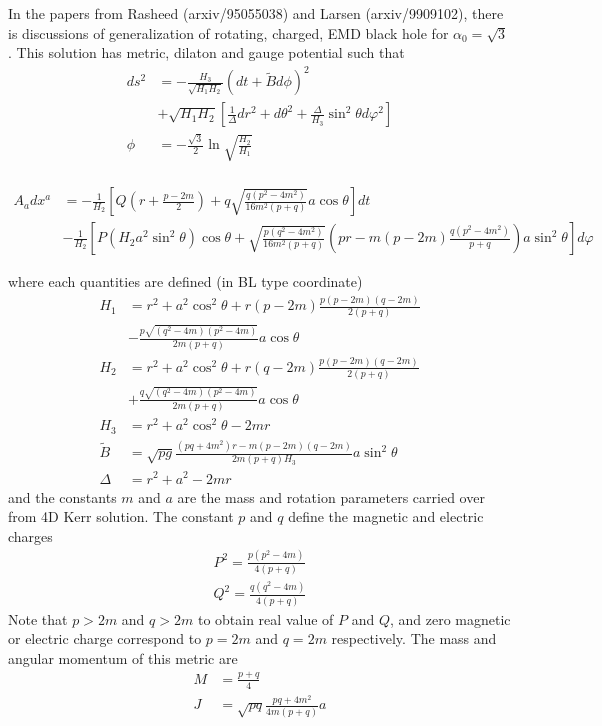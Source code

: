 \documentclass[%
 reprint,
 amsmath,amssymb,
 aps,
]{revtex4-1}
\begin{document}
In the papers from Rasheed (arxiv/95055038) and Larsen (arxiv/9909102), there is discussions of generalization of rotating, charged, EMD black hole for $\alpha_0 = \sqrt{3}$. This solution has metric, dilaton and gauge potential such that 
\begin{align}
ds^2 &= -\frac{H_3}{\sqrt{H_1 H_2}} (dt + \tilde{B} d \phi)^2 \nonumber \\
&+ \sqrt{H_1 H_2} \left[ \frac{1}{\Delta} dr^2 + d \theta^2 + \frac{\Delta}{H_3} \sin^2 \theta d \varphi^2 \right] \\
\phi &= -\frac{\sqrt{3}}{2} \ln \sqrt{\frac{H_2}{H_1}} \\
\end{align}
\begin{widetext}
\begin{align}
A_a dx^a &= - \frac{1}{H_2} \left[Q \left(r + \frac{p-2m}{2} \right) + q \sqrt{\frac{q (p^2-4m^2)}{16m^2 (p+q)}} a \cos \theta\right] dt \nonumber \\
	       &- \frac{1}{H_2} \left[ P (H_2 a^2 \sin^2 \theta) \cos \theta + \sqrt{\frac{p (q^2-4m^2)}{16m^2 (p+q)}} \left(pr-m(p-2m) \frac{q (p^2-4m^2)}{p+q} \right) a \sin^2 \theta \right] d\varphi
\end{align}
\end{widetext}
where each quantities are defined (in BL type coordinate)
\begin{align}
H_1 &= r^2 + a^2 \cos^2 \theta + r (p-2m) \frac{p(p-2m)(q-2m)}{2(p+q)}\nonumber \\
&-\frac{p \sqrt{(q^2-4m)(p^2-4m)}}{2m(p+q)}a \cos \theta\\
H_2 &= r^2 + a^2 \cos^2 \theta + r (q-2m) \frac{p(p-2m)(q-2m)}{2(p+q)}\nonumber \\
&+\frac{q \sqrt{(q^2-4m)(p^2-4m)}}{2m(p+q)}a \cos \theta\\
H_3 &= r^2 + a^2 \cos^2 \theta - 2 m r \\
\tilde{B} &= \sqrt{pg} \frac{(pq+4m^2)r-m(p-2m)(q-2m)}{2m(p+q)H_3} a \sin^2 \theta \\
\Delta &= r^2 + a^2 - 2mr
\end{align}
and the constants $m$ and $a$ are the mass and rotation parameters carried over from 4D Kerr solution. The constant $p$ and $q$ define the magnetic and electric charges
\begin{align}
P^2 = \frac{p (p^2-4m)}{4(p+q)} \\
Q^2 = \frac{q (q^2-4m)}{4(p+q)}
\end{align}
Note that $p > 2m$ and $q > 2m$ to obtain real value of $P$ and $Q$, and zero magnetic or electric charge correspond to $p=2m$ and $q=2m$ respectively. The mass and angular momentum of this metric are
\begin{align}
M &= \frac{p+q}{4}\\
J &= \sqrt{pq} \frac{pq + 4m^2}{4m (p+q)} a
\end{align}
\end{document}
